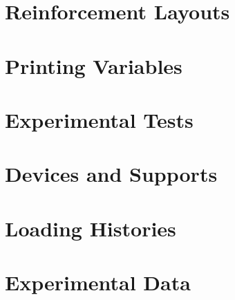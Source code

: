 \section{Reinforcement Layouts}


\section{Printing Variables}


\section{Experimental Tests}


\section{Devices and Supports}


\section{Loading Histories}


\section{Experimental Data}

